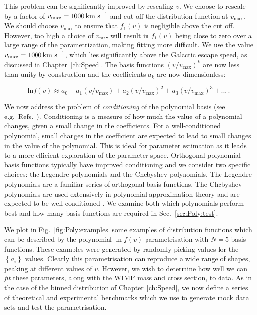 This problem can be significantly improved by rescaling $v$. We choose to rescale by a factor of $v_\textrm{max} = 1000 \,\textrm{km s}^{-1}$ and cut off the distribution function at $v_\textrm{max}$. We should choose $v_\textrm{max}$ to ensure that $f_1(v)$ is negligible above the cut off. However, too high a choice of $v_\textrm{max}$ will result in $f_1(v)$ being close to zero over a large range of the parametrization, making fitting more difficult. We use the value $v_\textrm{max} = 1000 \,\textrm{km s}^{-1}$, which lies significantly above the Galactic escape speed, as discussed in Chapter~\ref{ch:Speed}. The basis functions $(v/v_\textrm{max})^k$ are now less than unity by construction and the coefficients $a_k$ are now dimensionless:

\begin{equation}
\textrm{ln}f(v) \approx a_0 + a_1 (v/v_\textrm{max}) + a_2 (v/v_\textrm{max})^2 + a_3 (v/v_\textrm{max})^3 + ...\,.
\end{equation}

We now address the problem of \textit{conditioning} of the polynomial basis (see e.g.\ Refs.~\cite{Gautschi:1978, Wilkinson:1984}). Conditioning is a measure of how much the value of a polynomial changes, given a small change in the coefficients. For a well-conditioned polynomial, small changes in the coefficient are expected to lead to small changes in the value of the polynomial. This is ideal for parameter estimation as it leads to a more efficient exploration of the parameter space. Orthogonal polynomial basis functions typically have improved conditioning \cite{Gautschi:1978} and we consider two specific choices: the Legendre polynomials and the Chebyshev polynomials. The Legendre polynomials are a familiar series of orthogonal basis functions. The Chebyshev polynomials are used extensively in polynomial approximation theory \cite{Mason:2002} and are expected to be well conditioned \cite{Gautschi:1978}. We examine both which polynomials perform best and how many basis functions are required in Sec.~\ref{sec:Poly:test}.

We plot in Fig.~\ref{fig:Poly:examples} some examples of distribution functions which can be described by the polynomial $\ln f(v)$ parametrisation with $N=5$ basis functions. These examples were generated by randomly picking values for the $\left\{a_i\right\}$ values. Clearly this parametrisation can reproduce a wide range of shapes, peaking at different values of $v$. However, we wish to determine how well we can \textit{fit} these parameters, along with the WIMP mass and cross section, to data. As in the case of the binned distribution of Chapter~\ref{ch:Speed}, we now define a series of theoretical and experimental benchmarks which we use to generate mock data sets and test the parametrisation. 

